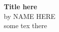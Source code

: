 \begin{center}
\textbf{\LARGE Title here}\\[30pt]
by NAME HERE\\ [25pt]

some tex there

\end{center}
